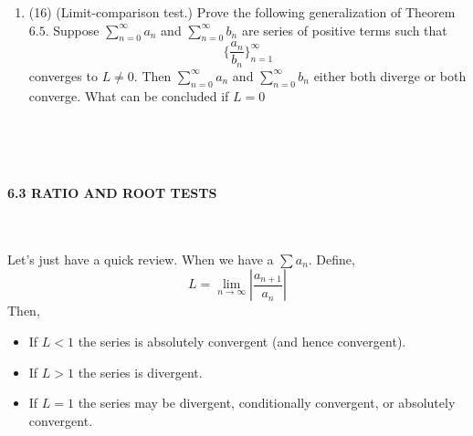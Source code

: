 \documentclass[fleqn]{article}
\begin{document}
\begin{enumerate}
\begin{enumerate}
          

    \end{enumerate}

    \item (16) (Limit-comparison test.) Prove the following generalization of Theorem $6.5$. Suppose
    $\sum\limits_{n=0}^{\infty} a_n$ and $\sum\limits_{n=0}^{\infty} b_n$ are series of positive terms such that 
    $$\{ \dfrac{a_n}{b_n} \}_{n=1}^{\infty}$$
    converges to $L\neq 0$. Then $\sum\limits_{n=0}^{\infty} a_n$ and $\sum\limits_{n=0}^{\infty} b_n$  either both diverge or both converge.
    What can be concluded if $L=0$

      \textcolor{hwColor}{
        \\
        \\
        \\
      }
 
  \end{enumerate}


  \textbf{6.3 RATIO AND ROOT TESTS}

    \textcolor{hwColor}{
      \\
      \\
      Let's just have a quick review. When we have a $\sum a_n$. Define,
      $$
        L=\lim\limits_{n \to \infty} |\dfrac{a_{n+1}}{a_n}|
      $$
      Then,
      \\
      \begin{itemize}
        \item If $L<1$ the series is absolutely convergent (and hence convergent).
        \item If $L>1$ the series is divergent.
        \item If $L=1$ the series may be divergent, conditionally convergent, or absolutely convergent.
      \end{itemize}
    }
\end{document}

